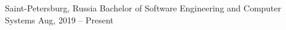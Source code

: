 
\begin{cvHeadingList}
    {Saint-Petersburg, Russia}
    {Bachelor of Software Engineering and Computer Systems}
    {Aug, 2019 – Present}
\end{cvHeadingList}
